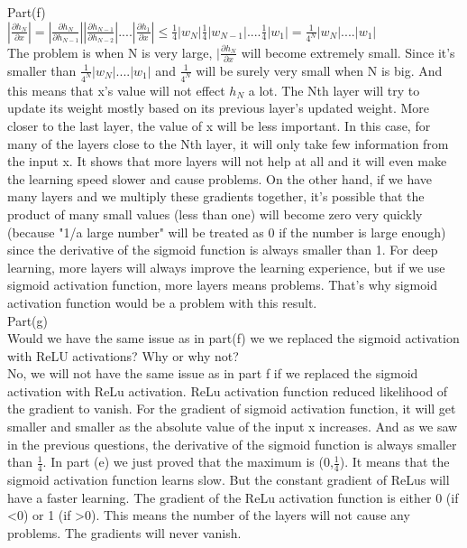 \documentclass[12pt]{article}
\begin{document}
Part(f)\\
$|\frac{\partial h_N }{\partial x} |= |\frac{\partial h_N }{\partial h_{N-1}}||\frac{\partial h_{N-1} }{\partial h_{N-2}}| .... |\frac{\partial h_1 }{\partial x}| \leq  \frac{1}{4}|w_N|\frac{1}{4}|w_{N-1}| .... \frac{1}{4}|w_1| = \frac{1}{4^{N}}|w_N| ....|w_1|$\\
The problem is when N is very large, $|\frac{\partial h_N }{\partial x} $ will become extremely small. Since it's smaller than $\frac{1}{4^{N}}|w_N| ....|w_1|$ and $\frac{1}{4^{N}}$ will be surely very small when N is big. And this means that x's value will not effect $h_N$ a lot. The Nth layer will try to update its
weight mostly based on its previous layer's updated weight. More closer to the last layer,
the value of x will be less important. In this case, for many of the layers close to the Nth
layer, it will only take few information from the input x. It shows that more layers will not
help at all and it will even make the learning speed slower and cause problems. On the
other hand, if we have many layers and we multiply these gradients together, it's possible
that the product of many small values (less than one) will become zero very quickly
(because "1/a large number" will be treated as 0 if the number is large enough) since the
derivative of the sigmoid function is always smaller than 1. For deep learning, more layers
will always improve the learning experience, but if we use sigmoid activation function,
more layers means problems. That's why sigmoid activation function would be a problem
with this result.\\

Part(g)\\
Would we have the same issue as in part(f) we we replaced the sigmoid activation with ReLU activations? Why or why not?\\
No, we will not have the same issue as in part f if we replaced the sigmoid activation with
ReLu activation. ReLu activation function reduced likelihood of the gradient to vanish. For
the gradient of sigmoid activation function, it will get smaller and smaller as the absolute
value of the input x increases. And as we saw in the previous questions, the derivative of
the sigmoid function is always smaller than $\frac{1}{4}$. In part (e) we just proved that the
maximum is (0,$\frac{1}{4}$). It means that the sigmoid activation function learns slow. But the
constant gradient of ReLus will have a faster learning. The gradient of the ReLu activation
function is either 0 (if <0) or 1 (if >0). This means the number of the layers will not cause
any problems. The gradients will never vanish.
\end{document}
